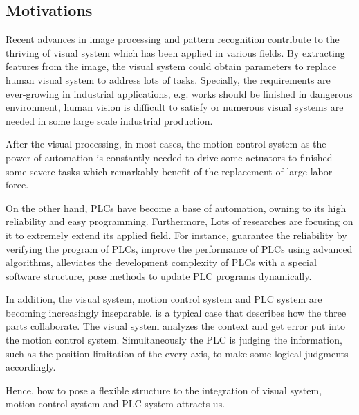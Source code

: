 \documentclass[journal,UTF8]{IEEEtran}
\begin{document}
\subsection{Motivations}
Recent advances in image processing and pattern recognition contribute to the thriving of visual system which has been applied in various fields. By extracting features from the image, the visual system could obtain parameters to replace human visual system to address lots of tasks. Specially, the requirements are ever-growing in industrial applications, e.g. works should be finished in dangerous environment, human vision is difficult to satisfy or numerous visual systems are needed in some large scale industrial production. 

After the visual processing, in most cases, the motion control system as the power of automation is constantly needed to drive some actuators to finished some severe tasks which remarkably benefit of the replacement of large labor force. 

On the other hand, PLCs have become a base of automation, owning to its high reliability and easy programming\cite{Hossain2014Advanced}. Furthermore, Lots of researches are focusing on it to extremely extend its applied field. For instance, \cite{Jiang2013System,Jiang2013Bayesian} guarantee the reliability by verifying the program of PLCs, \cite{Gerk2006Advanced,Dominic2016PLC} improve the performance of PLCs using advanced algorithms, \cite{wu2018customized} alleviates the development complexity of PLCs with a special software structure, \cite{Sch2013Development} pose methods to update PLC programs dynamically.


In addition, the visual system, motion control system and PLC system are becoming increasingly inseparable. \cite{Chen2014A} is a typical case that describes how the three parts collaborate. The visual system analyzes the context and get error put into the motion control system. Simultaneously the PLC is judging the information, such as the position limitation of the every axis, to make some logical judgments accordingly. 

Hence, how to pose a flexible structure to the integration of visual system, motion control system and  PLC system attracts us.
\end{document}
